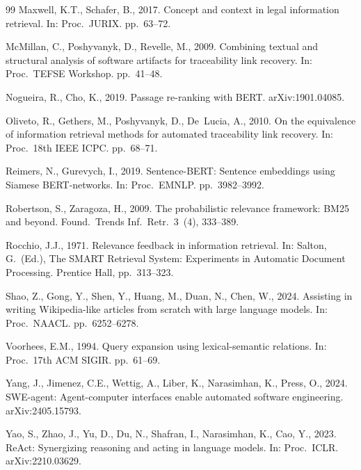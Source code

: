 \documentclass[a4paper,fleqn]{cas-sc}
\begin{document}
\begin{thebibliography}{99}
Maxwell, K.T., Schafer, B., 2017. Concept and context in legal information retrieval. In: Proc.\ JURIX. pp.\ 63--72.

McMillan, C., Poshyvanyk, D., Revelle, M., 2009. Combining textual and structural analysis of software artifacts for traceability link recovery. In: Proc.\ TEFSE Workshop. pp.\ 41--48.

Nogueira, R., Cho, K., 2019. Passage re-ranking with BERT. arXiv:1901.04085.

Oliveto, R., Gethers, M., Poshyvanyk, D., De~Lucia, A., 2010. On the equivalence of information retrieval methods for automated traceability link recovery. In: Proc.\ 18th IEEE ICPC. pp.\ 68--71.

Reimers, N., Gurevych, I., 2019. Sentence-BERT: Sentence embeddings using Siamese BERT-networks. In: Proc.\ EMNLP. pp.\ 3982--3992.

Robertson, S., Zaragoza, H., 2009. The probabilistic relevance framework: BM25 and beyond. Found.\ Trends Inf.\ Retr.\ 3~(4), 333--389.

Rocchio, J.J., 1971. Relevance feedback in information retrieval. In: Salton, G.\ (Ed.), The SMART Retrieval System: Experiments in Automatic Document Processing. Prentice Hall, pp.\ 313--323.

Shao, Z., Gong, Y., Shen, Y., Huang, M., Duan, N., Chen, W., 2024. Assisting in writing Wikipedia-like articles from scratch with large language models. In: Proc.\ NAACL. pp.\ 6252--6278.

Voorhees, E.M., 1994. Query expansion using lexical-semantic relations. In: Proc.\ 17th ACM SIGIR. pp.\ 61--69.

Yang, J., Jimenez, C.E., Wettig, A., Liber, K., Narasimhan, K., Press, O., 2024. SWE-agent: Agent-computer interfaces enable automated software engineering. arXiv:2405.15793.

Yao, S., Zhao, J., Yu, D., Du, N., Shafran, I., Narasimhan, K., Cao, Y., 2023. ReAct: Synergizing reasoning and acting in language models. In: Proc.\ ICLR. arXiv:2210.03629.

\end{thebibliography}
\end{document}
